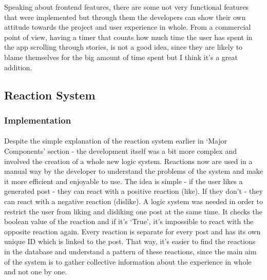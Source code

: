 \documentclass[12pt]{report}
\begin{document}
Speaking about frontend features, there are some not very functional features that were implemented but through them
the developers can show their own attitude towards the project and user experience in whole. From a commercial point of view,
having a timer that counts how much time the user has spent in the app scrolling through stories, is not a good idea,
since they are likely to blame themselves for the big amount of time spent but I think it's a great addition.

\clearpage

\subsection*{Reaction System}
\subsubsection*{Implementation}
\paragraph{}
Despite the simple explanation of the reaction system earlier in `Major Components' section - the development
itself was a bit more complex and involved the creation of a whole new logic system. Reactions now are used in a
manual way by the developer to understand the problems of the system and make it more efficient and enjoyable to use.
The idea is simple - if the user likes a generated post - they can react with a positive reaction (like). If they
don't - they can react with a negative reaction (dislike). A logic system was needed in order to restrict the user
from liking and disliking one post at the same time. It checks the boolean value of the reaction and if it's `True',
it's impossible to react with the opposite reaction again. Every reaction is separate for every post and has its own
unique ID which is linked to the post. That way, it's easier to find the reactions in the database and understand a 
pattern of these reactions, since the main aim of the system is to gather collective information about the experience
in whole and not one by one.
\end{document}
